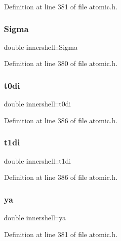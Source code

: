 Definition at line 381 of file atomic.\+h.

\mbox{\label{structinnershell_a2383238b23b454ec2ea9e020e3e1953c}} 
\subsubsection{\texorpdfstring{Sigma}{Sigma}}
{\footnotesize\ttfamily double innershell\+::\+Sigma}



Definition at line 380 of file atomic.\+h.

\mbox{\label{structinnershell_a6fe68b83024856ade7819bffe0edb3cd}} 
\subsubsection{\texorpdfstring{t0di}{t0di}}
{\footnotesize\ttfamily double innershell\+::t0di}



Definition at line 386 of file atomic.\+h.

\mbox{\label{structinnershell_a3da0028ce140404740e561671bc889cb}} 
\subsubsection{\texorpdfstring{t1di}{t1di}}
{\footnotesize\ttfamily double innershell\+::t1di}



Definition at line 386 of file atomic.\+h.

\mbox{\label{structinnershell_a0c982a600d5d6718ac24af993e4a92c1}} 
\subsubsection{\texorpdfstring{ya}{ya}}
{\footnotesize\ttfamily double innershell\+::ya}



Definition at line 381 of file atomic.\+h.

